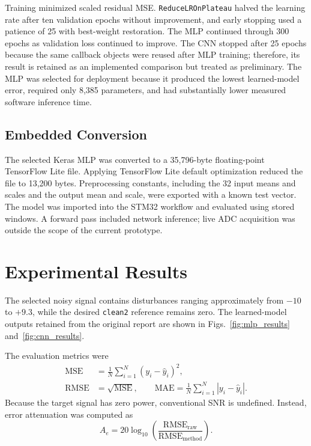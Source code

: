 \documentclass[conference]{IEEEtran}
\begin{document}
Training minimized scaled residual MSE. \texttt{ReduceLROnPlateau} halved the learning rate after ten validation epochs without improvement, and early stopping used a patience of 25 with best-weight restoration. The MLP continued through 300 epochs as validation loss continued to improve. The CNN stopped after 25 epochs because the same callback objects were reused after MLP training; therefore, its result is retained as an implemented comparison but treated as preliminary. The MLP was selected for deployment because it produced the lowest learned-model error, required only 8,385 parameters, and had substantially lower measured software inference time.

\subsection{Embedded Conversion}
The selected Keras MLP was converted to a 35,796-byte floating-point TensorFlow Lite file. Applying TensorFlow Lite default optimization reduced the file to 13,200 bytes. Preprocessing constants, including the 32 input means and scales and the output mean and scale, were exported with a known test vector. The model was imported into the STM32 workflow and evaluated using stored windows. A forward pass included network inference; live ADC acquisition was outside the scope of the current prototype.

\section{Experimental Results}
The selected noisy signal contains disturbances ranging approximately from $-10$ to $+9.3$, while the desired \texttt{clean2} reference remains zero. The learned-model outputs retained from the original report are shown in Figs.~\ref{fig:mlp_results} and~\ref{fig:cnn_results}.

The evaluation metrics were
\begin{align}
\mathrm{MSE} &= \frac{1}{N}\sum_{i=1}^{N}(y_i-\hat y_i)^2,\\
\mathrm{RMSE} &= \sqrt{\mathrm{MSE}},\qquad
\mathrm{MAE}=\frac{1}{N}\sum_{i=1}^{N}|y_i-\hat y_i|.
\end{align}
Because the target signal has zero power, conventional SNR is undefined. Instead, error attenuation was computed as
\begin{equation}
A_e=20\log_{10}\left(\frac{\mathrm{RMSE}_{\mathrm{raw}}}{\mathrm{RMSE}_{\mathrm{method}}}\right).
\end{equation}
\end{document}
